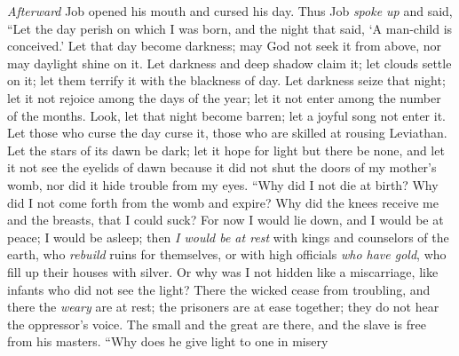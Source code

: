 \begin{biblechapter} %
 \textit{Afterward} Job opened his mouth and cursed his day.
\verse Thus Job \textit{spoke up} and said,
\verse “Let the day perish on which I was born, 
and the night that said, ‘A man-child is conceived.’
\verse Let that day become darkness; 
may God not seek it from above, 
nor may daylight shine on it.
\verse Let darkness and deep shadow claim it; 
let clouds settle on it; 
let them terrify it with the blackness of day.
\verse Let darkness seize that night; 
let it not rejoice among the days of the year; 
let it not enter among the number of the months.
\verse Look, let that night become barren; 
let a joyful song not enter it.
\verse Let those who curse the day curse it, 
those who are skilled at rousing Leviathan.
\verse Let the stars of its dawn be dark; 
let it hope for light but there be none, 
and let it not see the eyelids of dawn
\verse because it did not shut the doors of my mother’s womb, 
nor did it hide trouble from my eyes.
 “Why did I not die at birth? 
Why did I not come forth from the womb and expire?
\verse Why did the knees receive me 
and the breasts, that I could suck?
\verse For now I would lie down, and I would be at peace; 
I would be asleep; then \textit{I would be at rest}
\verse with kings and counselors of the earth, 
who \textit{rebuild}  ruins for themselves,
\verse or with high officials \textit{who have gold}, 
who fill up their houses with silver.
\verse Or why was I not hidden like a miscarriage, 
like infants who did not see the light?
\verse There the wicked cease from troubling, 
and there the \textit{weary} are at rest;
\verse the prisoners are at ease together; 
they do not hear the oppressor’s voice.
\verse The small and the great are there, 
and the slave is free from his masters.
 “Why does he give light to one in misery 

\end{biblechapter}
